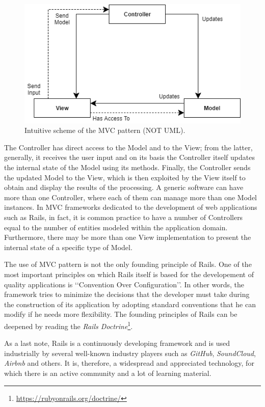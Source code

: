 \documentclass[a4paper, english]{article}
\begin{document}
\begin{figure}[!tbp]
\centering
\includegraphics[scale=0.7]{figures/mvc.png}
\caption{Intuitive scheme of the MVC pattern (NOT UML).}
\label{fig:mvc}
\end{figure}

The Controller has direct access to the Model and to the View; from the latter, generally, it receives the user input and on its basis the Controller itself updates the internal state of the Model using its methods. Finally, the Controller sends the updated Model to the View, which is then exploited by the View itself to obtain and display the results of the processing. A generic software can have more than one Controller, where each of them can manage more than one Model instances. In MVC frameworks dedicated to the development of web applications such as Rails, in fact, it is common practice to have a number of Controllers equal to the number of entities modeled within the application domain. Furthermore, there may be more than one View implementation to present the internal state of a specific type of Model.

The use of MVC pattern is not the only founding principle of Rails. One of the most important principles on which Rails itself is based for the developement of quality applications is \lq\lq Convention Over Configuration\rq\rq{}. In other words, the framework tries to minimize the decisions that the developer must take during the construction of its application by adopting standard conventions that he can modify if he needs more flexibility. The founding principles of Rails can be deepened by reading the \emph{Rails Doctrine}\footnote{\url{https://rubyonrails.org/doctrine/}}.

As a last note, Rails is a continuously developing framework and is used industrially by several well-known industry players such as \emph{GitHub}, \emph{SoundCloud}, \emph{Airbnb} and others. It is, therefore, a widespread and appreciated technology, for which there is an active community and a lot of learning material.
\end{document}
